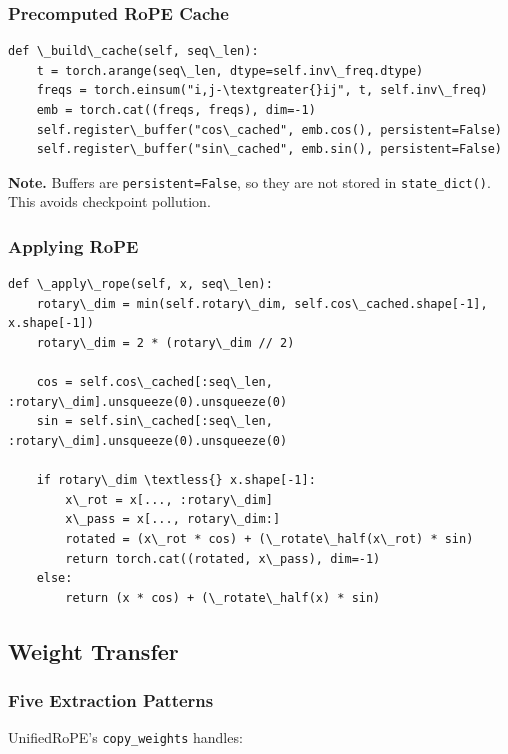 \subsubsection{Precomputed RoPE Cache}

\begin{lstlisting}
def \_build\_cache(self, seq\_len):
    t = torch.arange(seq\_len, dtype=self.inv\_freq.dtype)
    freqs = torch.einsum("i,j-\textgreater{}ij", t, self.inv\_freq)
    emb = torch.cat((freqs, freqs), dim=-1)
    self.register\_buffer("cos\_cached", emb.cos(), persistent=False)
    self.register\_buffer("sin\_cached", emb.sin(), persistent=False)
\end{lstlisting}

\textbf{Note.} Buffers are \texttt{persistent=False}, so they are not stored in 
\texttt{state\_dict()}. This avoids checkpoint pollution.

\subsubsection{Applying RoPE}

\begin{lstlisting}
def \_apply\_rope(self, x, seq\_len):
    rotary\_dim = min(self.rotary\_dim, self.cos\_cached.shape[-1], x.shape[-1])
    rotary\_dim = 2 * (rotary\_dim // 2)
    
    cos = self.cos\_cached[:seq\_len, :rotary\_dim].unsqueeze(0).unsqueeze(0)
    sin = self.sin\_cached[:seq\_len, :rotary\_dim].unsqueeze(0).unsqueeze(0)
    
    if rotary\_dim \textless{} x.shape[-1]:
        x\_rot = x[..., :rotary\_dim]
        x\_pass = x[..., rotary\_dim:]
        rotated = (x\_rot * cos) + (\_rotate\_half(x\_rot) * sin)
        return torch.cat((rotated, x\_pass), dim=-1)
    else:
        return (x * cos) + (\_rotate\_half(x) * sin)
\end{lstlisting}

\subsection{Weight Transfer}

\subsubsection{Five Extraction Patterns}

UnifiedRoPE's \texttt{copy\_weights} handles:

